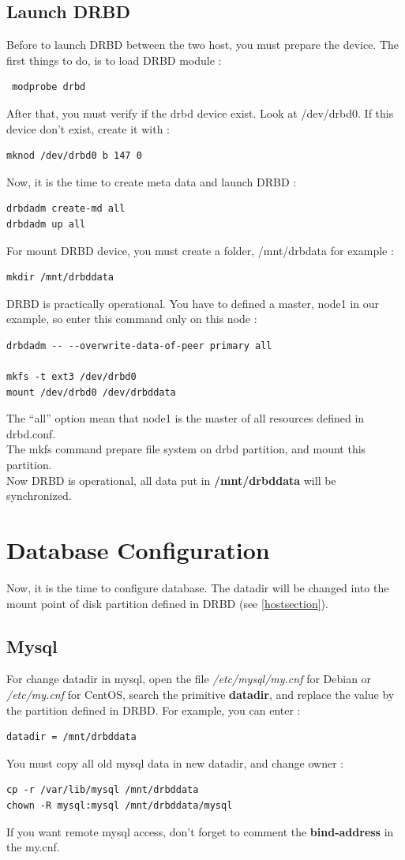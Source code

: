 \documentclass[a4paper,10pt]{report}
\begin{document}
\subsection{Launch DRBD}
Before to launch DRBD between the two host, you must prepare the device. The first things to do, is to load DRBD module :
\begin{lstlisting}
 modprobe drbd
\end{lstlisting}
After that, you must verify if the drbd device exist. Look at /dev/drbd0. If this device don't exist, create it with :
\begin{lstlisting}
mknod /dev/drbd0 b 147 0
\end{lstlisting}
Now, it is the time to create meta data and launch DRBD :
\begin{lstlisting}
drbdadm create-md all
drbdadm up all
\end{lstlisting}
For mount DRBD device, you must create a folder, /mnt/drbdata for example :
\begin{lstlisting}
mkdir /mnt/drbddata
\end{lstlisting}
DRBD is practically operational. You have to defined a master, node1 in our example, so enter this command only on this node :
\begin{lstlisting}
drbdadm -- --overwrite-data-of-peer primary all

mkfs -t ext3 /dev/drbd0
mount /dev/drbd0 /dev/drbddata
\end{lstlisting}
The ``all'' option mean that node1 is the master of all resources defined in drbd.conf.\\
The mkfs command prepare file system on drbd partition, and mount this partition.\\
Now DRBD is operational, all data put in \textbf{/mnt/drbddata} will be synchronized.




\section{Database Configuration}
Now, it is the time to configure database. The datadir will be changed into the  mount point of disk partition defined in DRBD (see  \ref{hostsection}).

\subsection{Mysql}
For change datadir in mysql, open the file \textit{/etc/mysql/my.cnf} for Debian or \textit{/etc/my.cnf} for CentOS, search the primitive \textbf{datadir}, and replace the value by the partition defined in DRBD.
For example, you can enter :
\begin{lstlisting}
datadir = /mnt/drbddata
\end{lstlisting}
You must copy all old mysql data in new datadir, and change owner :
\begin{lstlisting}
cp -r /var/lib/mysql /mnt/drbddata
chown -R mysql:mysql /mnt/drbddata/mysql
\end{lstlisting}
If you want remote mysql access, don't forget to comment the \textbf{bind-address} in the my.cnf.\\
\end{document}
